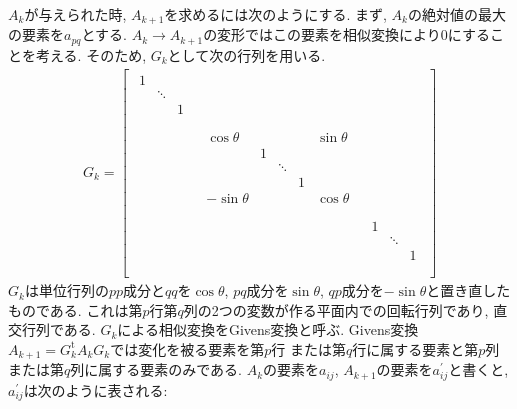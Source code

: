 $A_{k}$が与えられた時, $A_{k+1}$を求めるには次のようにする.
まず, $A_{k}$の絶対値の最大の要素を$a_{pq}$とする.
$A_{k} \to A_{k+1}$の変形ではこの要素を相似変換により$0$にすることを考える.
そのため, $G_{k}$として次の行列を用いる.
\begin{align}
 G_{k} =
 \left[
 \begin{array}{ccc}
   \begin{array}{ccc}
     1 &        &    \\
       & \ddots &    \\
       &        & 1  \\
   \end{array}
   &  &  
   \\
   &
   \begin{array}{ccccc}
     \cos \theta  &   &        &   & \sin \theta \\
                  & 1 &        &   &             \\
                  &   & \ddots &   &             \\
                  &   &        & 1 &             \\
     -\sin \theta &   &        &   & \cos \theta \\
   \end{array}  
  & 
  \\
  & 
  & 
  \begin{array}{ccc}
     1 &        &    \\
       & \ddots &    \\
       &        & 1  \\
  \end{array}
  \\
 \end{array}
 \right]
\end{align}
$G_{k}$は単位行列の$pp$成分と$qq$を$\cos\theta$, $pq$成分を$\sin\theta$, $qp$成分を$-\sin\theta$と置き直したものである.
これは第$p$行第$q$列の2つの変数が作る平面内での回転行列であり, 直交行列である.
$G_{k}$による相似変換をGivens変換と呼ぶ.
Givens変換$A_{k+1} = G_{k}^{\mathrm{t}} A_{k} G_{k}$では変化を被る要素を第$p$行
または第$q$行に属する要素と第$p$列または第$q$列に属する要素のみである.
$A_{k}$の要素を$a_{ij}$, $A_{k+1}$の要素を$a_{ij}^{\prime}$と書くと,
$a_{ij}^{\prime}$は次のように表される:
